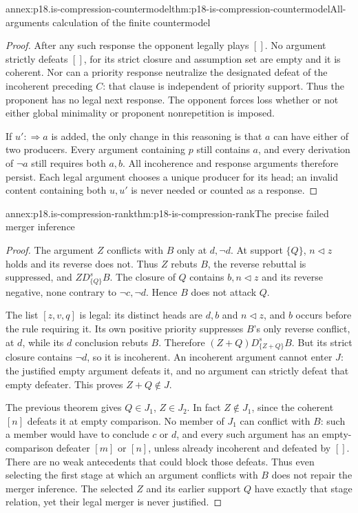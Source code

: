 \begin{annexitem}{annex:p18.is-compression-countermodel}{thm:p18-is-compression-countermodel}{All-arguments calculation of the finite countermodel}
\begin{proof}
After any such response the opponent legally plays \([]\).
No argument strictly defeats \([]\), for its strict closure and
assumption set are empty and it is coherent.
Nor can a priority response neutralize the designated defeat
of the incoherent preceding \(C\): that clause is independent
of priority support.
Thus the proponent has no legal next response.
The opponent forces loss whether or not either global minimality
or proponent nonrepetition is imposed.

If \(u':\Rightarrow a\) is added, the only change in this reasoning
is that \(a\) can have either of two producers. Every argument
containing \(p\) still contains \(a\), and every derivation of
\(\neg a\) still requires both \(a,b\).
All incoherence and response arguments therefore persist.
Each legal argument chooses a unique producer for its head;
an invalid content containing both \(u,u'\) is never needed
or counted as a response.
\end{proof}
\end{annexitem}

\begin{annexitem}{annex:p18.is-compression-rank}{thm:p18-is-compression-rank}{The precise failed merger inference}
\begin{proof}
The argument \(Z\) conflicts with \(B\) only at \(d,\neg d\).
At support \(\{Q\}\), \(n\triangleleft z\) holds and its reverse
does not. Thus \(Z\) rebuts \(B\), the reverse rebuttal is
suppressed, and \(Z D_{\{Q\}}^s B\).
The closure of \(Q\) contains \(b,n\triangleleft z\) and its
reverse negative, none contrary to \(\neg c,\neg d\).
Hence \(B\) does not attack \(Q\).

The list \([z,v,q]\) is legal: its distinct heads are \(d,b\)
and \(n\triangleleft z\), and \(b\) occurs before the rule
requiring it. Its own positive priority suppresses \(B\)'s
only reverse conflict, at \(d\), while its \(d\) conclusion
rebuts \(B\). Therefore
\((Z+Q)D_{\{Z+Q\}}^s B\).
But its strict closure contains \(\neg d\), so it is incoherent.
An incoherent argument cannot enter \(J\): the justified empty
argument defeats it, and no argument can strictly defeat that
empty defeater. This proves \(Z+Q\notin J\).

The previous theorem gives \(Q\in J_1\), \(Z\in J_2\).
In fact \(Z\notin J_1\), since the coherent \([n]\) defeats it
at empty comparison. No member of \(J_1\) can conflict with \(B\):
such a member would have to conclude \(c\) or \(d\), and every
such argument has an empty-comparison defeater \([m]\) or
\([n]\), unless already incoherent and defeated by \([]\).
There are no weak antecedents that could block those defeats.
Thus even selecting the first stage at which an argument
conflicts with \(B\) does not repair the merger inference.
The selected \(Z\) and its earlier support \(Q\) have exactly
that stage relation, yet their legal merger is never justified.
\end{proof}
\end{annexitem}

